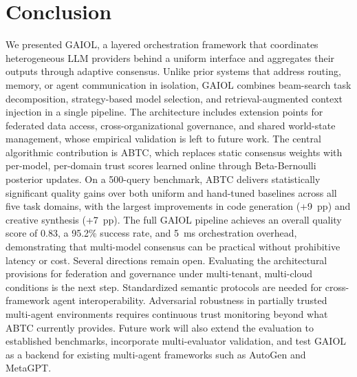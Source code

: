 \documentclass{iopjournal}
\begin{document}
\section{Conclusion}
\label{sec:conclusion}

We presented GAIOL, a layered orchestration framework that coordinates heterogeneous LLM providers behind a uniform interface and aggregates their outputs through adaptive consensus. Unlike prior systems that address routing, memory, or agent communication in isolation, GAIOL combines beam-search task decomposition, strategy-based model selection, and retrieval-augmented context injection in a single pipeline. The architecture includes extension points for federated data access, cross-organizational governance, and shared world-state management, whose empirical validation is left to future work. The central algorithmic contribution is ABTC, which replaces static consensus weights with per-model, per-domain trust scores learned online through Beta-Bernoulli posterior updates. On a 500-query benchmark, ABTC delivers statistically significant quality gains over both uniform and hand-tuned baselines across all five task domains, with the largest improvements in code generation (+9~pp) and creative synthesis (+7~pp). The full GAIOL pipeline achieves an overall quality score of 0.83, a 95.2\% success rate, and 5~ms orchestration overhead, demonstrating that multi-model consensus can be practical without prohibitive latency or cost. Several directions remain open. Evaluating the architectural provisions for federation and governance under multi-tenant, multi-cloud conditions is the next step. Standardized semantic protocols are needed for cross-framework agent interoperability. Adversarial robustness in partially trusted multi-agent environments requires continuous trust monitoring beyond what ABTC currently provides. Future work will also extend the evaluation to established benchmarks, incorporate multi-evaluator validation, and test GAIOL as a backend for existing multi-agent frameworks such as AutoGen and MetaGPT.

\end{document}
